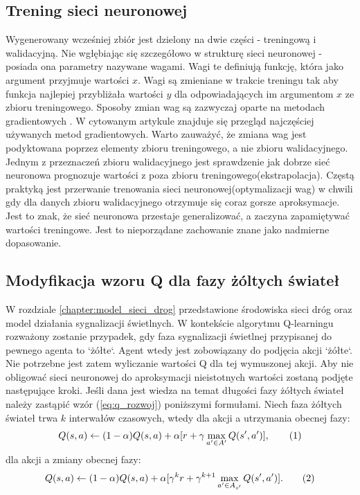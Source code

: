 \documentclass[12pt]{book}
\theoremstyle{plain}
\newcommand\addtag{\refstepcounter{equation}
\renewcommand{\labelenumii}{\theenumii}
\renewcommand{\theenumii}{\theenumi.\arabic{enumii}.}
\tag{\theequation}}
\newcommand{\myref}[1]{(\ref{#1})}
\begin{document}
\subsection{Trening sieci neuronowej}
Wygenerowany wcześniej zbiór jest dzielony na dwie części - treningową i walidacyjną. 
Nie wgłębiając się szczegółowo w strukturę sieci neuronowej - posiada ona parametry nazywane wagami. Wagi te definiują funkcję, która jako argument przyjmuje wartości $x$. Wagi są zmieniane w trakcie treningu tak aby funkcja najlepiej przybliżała wartości $y$ dla odpowiadających im argumentom $x$ ze zbioru treningowego. Sposoby zmian wag są zazwyczaj oparte na metodach gradientowych \cite{overview_optimizers}. W cytowanym artykule znajduje się przegląd najczęściej używanych metod gradientowych. Warto zauważyć, że zmiana wag jest podyktowana poprzez elementy zbioru treningowego, a nie zbioru walidacyjnego. Jednym z przeznaczeń zbioru walidacyjnego jest sprawdzenie jak dobrze sieć neuronowa prognozuje wartości z poza zbioru treningowego(ekstrapolacja). Częstą praktyką jest przerwanie trenowania sieci neuronowej(optymalizacji wag) w chwili gdy dla danych zbioru walidacyjnego otrzymuje się coraz gorsze aproksymacje. Jest to znak, że sieć neuronowa przestaje generalizować, a zaczyna zapamiętywać wartości treningowe. Jest to nieporządane zachowanie znane jako nadmierne dopasowanie. 
\subsection{Modyfikacja wzoru Q dla fazy żóltych świateł} \label{sec:q_mod}
W rozdziale \ref{chapter:model_sieci_drog} przedstawione środowiska sieci dróg oraz model działania sygnalizacji świetlnych. W kontekście algorytmu Q-learningu rozważony zostanie przypadek, gdy faza sygnalizacji świetlnej przypisanej do pewnego agenta to `żółte`. Agent wtedy jest zobowiązany do podjęcia akcji `żółte`. Nie potrzebne jest zatem wyliczanie wartości Q dla tej wymuszonej akcji. Aby nie obligować sieci neuronowej do aproksymacji nieistotnych wartości zostaną podjęte następujące kroki.
Jeśli dana jest wiedza na temat długości fazy żółtych świateł należy zastąpić wzór \myref{eq:q_rozwoj} poniższymi formułami. Niech faza żółtych świateł trwa $k$ interwałów czasowych, wtedy dla akcji a utrzymania obecnej fazy:
\[Q(s,a) \leftarrow (1-\alpha)Q(s,a) + \alpha [r + \gamma \max_{a' \in A'} Q(s',a')], \addtag \label{eq:Q_DQN_I} \]
dla akcji a zmiany obecnej fazy:
\[Q(s,a) \leftarrow  (1-\alpha)Q(s,a) + \alpha [\gamma^{k} r + \gamma^{k+1} \max_{a' \in A_{s'}} Q(s',a')]. \addtag \label{eq:Q_DQN_II} \]
\end{document}
